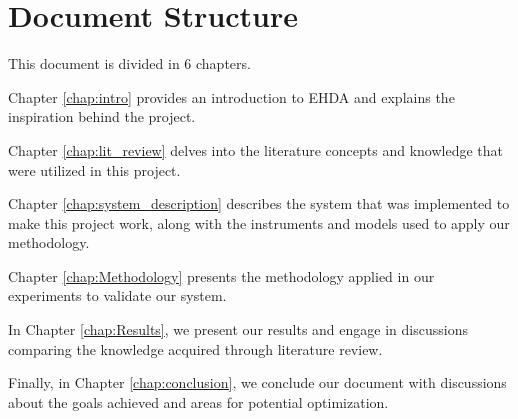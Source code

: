 \section{Document Structure}
\label{sec:doc_struct}

This document is divided in 6 chapters. 

Chapter \ref{chap:intro} provides an introduction to EHDA and explains the inspiration behind the project.

Chapter \ref{chap:lit_review} delves into the literature concepts and knowledge that were utilized in this project.

Chapter \ref{chap:system_description} describes the system that was implemented to make this project work, along with the instruments and models used to apply our methodology.

Chapter \ref{chap:Methodology} presents the methodology applied in our experiments to validate our system.

In Chapter \ref{chap:Results}, we present our results and engage in discussions comparing the knowledge acquired through literature review.

Finally, in Chapter \ref{chap:conclusion}, we conclude our document with discussions about the goals achieved and areas for potential optimization.